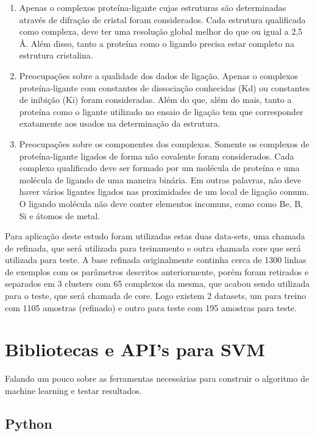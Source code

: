 \documentclass[tcc, capa]{texucpel}
\begin{document}
\begin{enumerate}
\item Apenas o complexos proteína-ligante cujas estruturas são determinadas através de difração de cristal foram considerados. Cada estrutura qualificada como complexa, deve ter uma resolução global melhor do que ou igual a 2,5 Å. Além disso, tanto a proteína como o ligando precisa estar completo na estrutura cristalina.
\item Preocupações sobre a qualidade dos dados de ligação. Apenas o complexos proteína-ligante com constantes de dissociação conhecidas (Kd) ou constantes de inibição (Ki) foram consideradas. Além do que, além do mais, tanto a proteína como o ligante utilizado no ensaio de ligação tem que corresponder exatamente aos usados na determinação da estrutura.
\item Preocupações sobre os componentes dos complexos. Somente os complexos de proteína-ligante ligados de forma não covalente foram considerados. Cada complexo qualificado deve ser formado por um molécula de proteína e uma molécula de ligando de uma maneira binária. Em outras palavras, não deve haver vários ligantes ligados nas proximidades de um local de ligação comum. O ligando molécula não deve conter elementos incomuns, como como Be, B, Si e átomos de metal.
\end{enumerate}

Para aplicação deste estudo foram utilizadas estas duas data-sets, uma chamada de refinada, que será utilizada para treinamento e outra chamada core que será utilizada para teste. 
A base refinada originalmente continha cerca de 1300 linhas de exemplos com os parâmetros descritos anteriormente, porém foram retirados e separados em 3 clusters com 65 complexos da mesma, que acabou sendo utilizada para o teste, que será chamada de core. Logo existem  2 datasets, um para treino com 1105 amostras (refinado) e outro para teste com 195 amostras para teste.


\section{Bibliotecas e API's para SVM}

Falando um pouco sobre as ferramentas necessárias para construir o algoritmo de machine learning e testar resultados.

\subsection{Python}%
\end{document}
